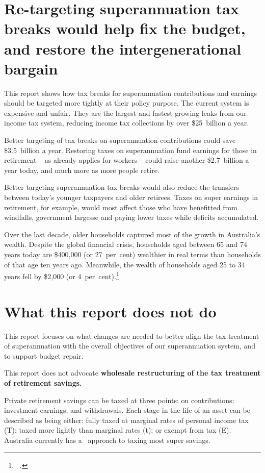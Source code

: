 \documentclass{grattanAlpha}
\begin{document}
\section{Re-targeting superannuation tax breaks would help fix the budget, and restore the intergenerational bargain}
This report shows how tax breaks for superannuation contributions and earnings should be targeted more tightly at their policy purpose. The current system is expensive and unfair. They are the largest and fastest growing leaks from our income tax system, reducing income tax collections by over \$25~billion a year. 

Better targeting of tax breaks on superannuation contributions could save \$3.5~billion a year. Restoring taxes on superannuation fund earnings for those in retirement – as already applies for workers – could raise another \$2.7~billion a year today, and much more as more people retire. 

Better targeting superannuation tax breaks would also reduce the transfers between today’s younger taxpayers and older retirees. Taxes on super earnings in retirement, for example, would most affect those who have benefitted from windfalls, government largesse and paying lower taxes while deficits accumulated.

Over the last decade, older households captured most of the growth in Australia’s wealth. Despite the global financial crisis, households aged between 65 and 74 years today are \$400,000 (or 27~per~cent) wealthier in real terms than households of that age ten years ago. Meanwhile, the wealth of households aged 25 to 34 years fell by \$2,000 (or 4~per~cent).\footnote{\gao\ \textcites{ABS2015HouseholdIncomeWealth1314}{ABS2006HES0304}.}

\section{What this report does not do}\label{sec:SUPER-what-this-report-does-not-do}
This report focuses on what changes are needed to better align the tax treatment of superannuation with the overall objectives of our superannuation system, and to support budget repair. 

This report does not advocate \textbf{wholesale restructuring of the tax treatment of retirement savings. }

Private retirement savings can be taxed at three points: on contributions; investment earnings; and withdrawals. Each stage in the life of an asset can be described as being either: fully taxed at marginal rates of personal income tax (T); taxed more lightly than marginal rates (t); or exempt from tax (E). Australia currently has a \ttE\ approach to taxing most super savings.
\end{document}
